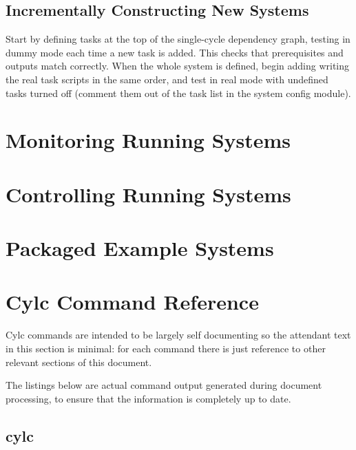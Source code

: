\documentclass[11pt,a4paper]{article}
\begin{document}
\subsection{Incrementally Constructing New Systems} 
\label{IncrementallyConstructingNewSystems}

Start by defining tasks at the top of the single-cycle dependency graph,
testing in dummy mode each time a new task is added.  This checks that
prerequisites and outputs match correctly. When the whole system
is defined, begin adding writing the real task scripts in the same order,
and test in real mode with undefined tasks turned off (comment them out 
of the task list in the system config module). 

\section{Monitoring Running Systems}
\label{MonitoringRunningSystems}


\section{Controlling Running Systems}
\label{ControllingRunningSystems}

\section{Packaged Example Systems}
\label{PackagedExampleSystems}

\pagebreak
\section{Cylc Command Reference}
\label{CylcCommandReference}

Cylc commands are intended to be largely self documenting so the
attendant text in this section is minimal: for each command there is
just reference to other relevant sections of this document.  

The listings below are actual command output generated during document
processing, to ensure that the information is completely up to date. 

\subsection{cylc}
\label{cylc}


\lstset{language=usage}

{

}
\end{document}
